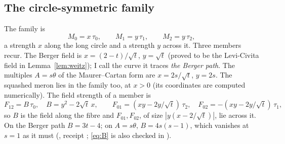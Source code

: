 \documentclass[11pt]{article}
\theoremstyle{definition}
\theoremstyle{remark}
\begin{document}
\subsection{The circle-symmetric family}\label{subsec:family}

The family is
\[
  M_0=x\,\tau_0,\qquad M_1=y\,\tau_1,\qquad M_2=y\,\tau_2 ,
\]
a strength $x$ along the long circle and a strength $y$ across it. Three members recur. The Berger field is
$x=(2-t)/\sqrt t$, $y=\sqrt t$ (proved to be the Levi-Civita field in Lemma~\ref{lem:weitz}); I call the curve it traces
\emph{the Berger path}. The multiples $A=s\theta$ of the Maurer--Cartan form are $x=2s/\sqrt t$, $y=2s$. The squashed
meron lies in the family too, at $x>0$ (its coordinates are computed numerically). The field strength of a member is
\begin{equation}\label{eq:B}
  F_{12}=B\,\tau_0,\quad B=y^2-2\sqrt t\,x,\qquad F_{01}=(xy-2y/\sqrt t)\,\tau_2,\quad F_{02}=-(xy-2y/\sqrt t)\,\tau_1 ,
\end{equation}
so $B$ is the field along the fibre and $F_{01},F_{02}$, of size $|y(x-2/\sqrt t)|$, lie across it. On the Berger path
$B=3t-4$; on $A=s\theta$, $B=4s(s-1)$, which vanishes at $s=1$ as it must
(, receipt ; \eqref{eq:B} is also checked in
).
\end{document}
